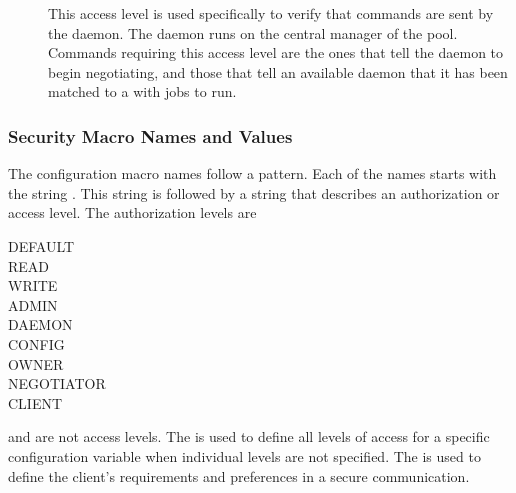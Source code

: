 \begin{description}
\item[] \label{dcperm:negotiator} This 
   access level is used specifically to verify that commands are
   sent by the  daemon.
   The  daemon runs on the central manager of
   the pool.
   Commands requiring this access
   level are the ones that tell the  daemon to begin
   negotiating, and those that tell an available  daemon
   that it has been matched to a  with jobs to run.

\end{description}

\subsubsection{\label{sec:Security-NamesValues} Security Macro Names and Values}



The configuration macro names follow a pattern.
Each of the names starts with the string
.
This string is followed by a string that describes an
authorization or access level.
The authorization levels are
\begin{description}
    \item[DEFAULT]
    \item[READ]
    \item[WRITE]
    \item[ADMIN]
    \item[DAEMON]
    \item[CONFIG]
    \item[OWNER]
    \item[NEGOTIATOR]
    \item[CLIENT]
\end{description}
 and  
are not access levels.
The  is used to define all levels of access
for a specific configuration variable when individual levels
are not specified.
The  is used to define the client's requirements
and preferences in a secure communication.

